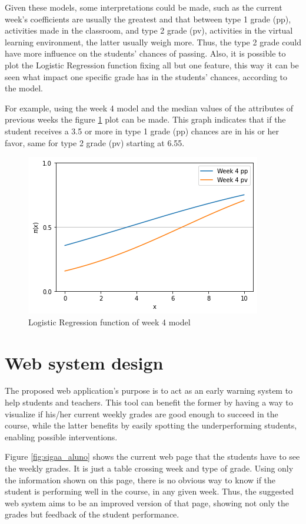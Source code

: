 Given these models, some interpretations could be made, such as the current week's coefficients are usually the greatest and that between type 1 grade (pp), activities made in the classroom, and type 2 grade (pv), activities in the virtual learning environment, the latter usually weigh more. Thus, the type 2 grade could have more influence on the students' chances of passing. Also, it is possible to plot the Logistic Regression function fixing all but one feature, this way it can be seen what impact one specific grade has in the students' chances, according to the model.

For example, using the week 4 model and the median values of the attributes of previous weeks the figure \ref{fig:w4m} plot can be made. This graph indicates that if the student receives a 3.5 or more in type 1 grade (pp) chances are in his or her favor, same for type 2 grade (pv) starting at 6.55.

\begin{figure}[htb]
	\centering
  	\includegraphics[scale=.7]{Resultados/week4models.png}
  	\caption{Logistic Regression function of week 4 model}
  	\label{fig:w4m}
\end{figure}

\section{Web system design}
The proposed web application's purpose is to act as an early warning system to help students and teachers. This tool can benefit the former by having a way to visualize if his/her current weekly grades are good enough to succeed in the course, while the latter benefits by easily spotting the underperforming students, enabling possible interventions.

Figure \ref{fig:sigaa_aluno} shows the current web page that the students have to see the weekly grades. It is just a table crossing week and type of grade. Using only the information shown on this page, there is no obvious way to know if the student is performing well in the course, in any given week. Thus, the suggested web system aims to be an improved version of that page, showing not only the grades but feedback of the student performance.


